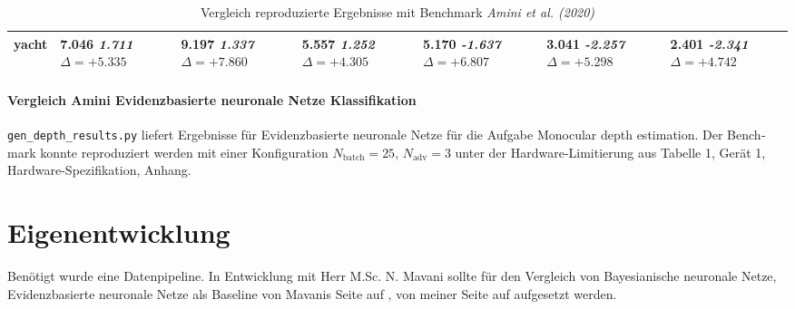 \begin{otherlanguage}{ngerman}
\begin{table*}[!htbp]
\begin{tabularx}{\textwidth}{|l|X|X|X|X|X|X|}
yacht 
& 7.046 \newline \textit{1.711} \newline \mbox{$\Delta=+5.335$} 
& 9.197 \newline \textit{1.337} \newline \mbox{$\Delta=+7.860$} 
& 5.557 \newline \textit{1.252} \newline \mbox{$\Delta=+4.305$} 
& 5.170 \newline \textit{-1.637} \newline \mbox{$\Delta=+6.807$} 
& 3.041 \newline \textit{-2.257} \newline \mbox{$\Delta=+5.298$} 
& 2.401 \newline \textit{-2.341} \newline \mbox{$\Delta=+4.742$} \\ \hline
\end{tabularx}
\caption{Vergleich reproduzierte Ergebnisse mit Benchmark \textit{Amini et al. (2020)}}
\label{tab:comparison_ours_vs_amini_tabularx_v3}
\end{table*}


\paragraph{Vergleich Amini \gls{Evidenzbasierte neuronale Netze} Klassifikation} \parencite{amini2020deep} \texttt{gen\_depth\_results.py} liefert Ergebnisse für \gls{Evidenzbasierte neuronale Netze} für die Aufgabe \glqq Monocular depth estimation\grqq. Der Benchmark konnte reproduziert werden mit einer Konfiguration $N_\text{batch}=25$, $N_\text{adv}=3$ unter der Hardware-Limitierung aus Tabelle 1, Gerät 1, Hardware-Spezifikation, Anhang. %



\section*{Eigenentwicklung}

Benötigt wurde eine Datenpipeline. In Entwicklung mit Herr M.Sc. N. Mavani sollte für den Vergleich von \gls{Bayesianische neuronale Netze}, \gls{Evidenzbasierte neuronale Netze} als Baseline von Mavanis Seite auf \parencite{Depeweg2019}, von meiner Seite auf \parencite{Ulmer2023} aufgesetzt werden.\newline


\end{otherlanguage}
